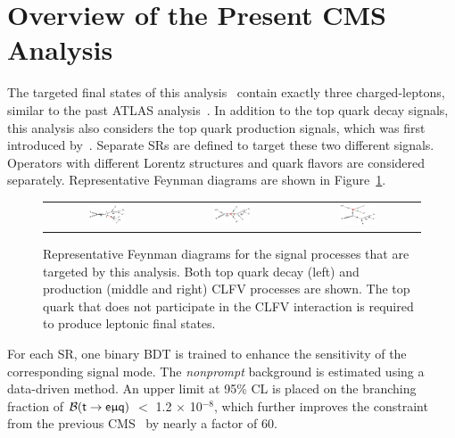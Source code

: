 \section{Overview of the Present CMS Analysis}
\label{sec:CLFV_This}

The targeted final states of this analysis~\cite{CMS:2023phe} contain exactly three charged-leptons, similar to the past ATLAS analysis~\cite{ATLAS-CONF-2018-044}. In addition to the top quark decay signals, this analysis also considers the top quark production signals, which was first introduced by~\cite{CMS:2022ztx}. Separate \acp{SR} are defined to target these two different signals. Operators with different Lorentz structures and quark flavors are considered separately. Representative Feynman diagrams are shown in Figure~\ref{fig:CMS_FD_This}. 
 
\begin{figure}[tbh!]
 \begin{center}
 \begin{tabular}{ccc}
 \includegraphics[width=0.31\textwidth]{figures/Part3/History/TT}&
 \includegraphics[width=0.33\textwidth]{figures/Part3/History/ST1}&
 \includegraphics[width=0.31\textwidth]{figures/Part3/History/ST2}\\
 \end{tabular}
 \caption{Representative Feynman diagrams for the signal processes that are targeted by this analysis. Both top quark decay (left) and production (middle and right) \ac{CLFV} processes are shown. The top quark that does not participate in the \ac{CLFV} interaction is required to produce leptonic final states.}
 \label{fig:CMS_FD_This}
 \end{center}
 \end{figure}
 
For each \ac{SR}, one binary \ac{BDT} is trained to enhance the sensitivity of the corresponding signal mode. The \emph{nonprompt} background is estimated using a data-driven method. An upper limit at 95\% \ac{CL} is placed on the branching fraction of $\mathcal{B}(\textsf{t}\rightarrow\textsf{e}\upmu\textsf{q})$ $<$ 1.2 $\times$ 10$^{-8}$, which further improves the constraint from the previous \ac{CMS}~\cite{CMS:2022ztx} by nearly a factor of 60.